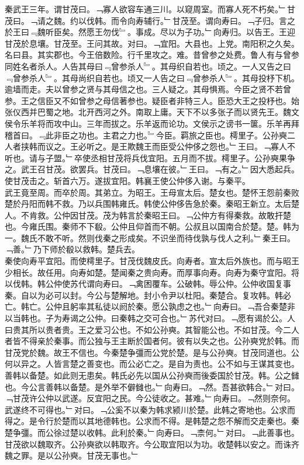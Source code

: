 \documentclass{zhvt-classic}
\begin{document}
\hspace*{2em}秦武王三年。谓甘茂曰。﹁寡人欲容车通三川。以窥周室。而寡人死不朽矣。﹂甘茂曰。﹁请之魏。约以伐韩。而令向寿辅行。﹂甘茂至。谓向寿曰。﹁子归。言之於王曰﹃魏听臣矣。然愿王勿伐﹄。事成。尽以为子功。﹂向寿归。以告王。王迎甘茂於息壤。甘茂至。王问其故。对曰。﹁宜阳。大县也。上党。南阳积之久矣。名曰县。其实郡也。今王倍数险。行千里攻之。难。昔曾参之处费。鲁人有与曾参同姓名者杀人。人告其母曰﹃曾参杀人﹄。其母织自若也。顷之。一人又告之曰﹃曾参杀人﹄。其母尚织自若也。顷又一人告之曰﹃曾参杀人﹄。其母投杼下机。逾墙而走。夫以曾参之贤与其母信之也。三人疑之。其母惧焉。今臣之贤不若曾参。王之信臣又不如曾参之母信著参也。疑臣者非特三人。臣恐大王之投杼也。始张仪西并巴蜀之地。北开西河之外。南取上庸。天下不以多张子而以贤先王。魏文侯令乐羊将而攻中山。三年而拔之。乐羊返而论功。文侯示之谤书一箧。乐羊再拜稽首曰。﹃此非臣之功也。主君之力也。﹄今臣。羁旅之臣也。樗里子。公孙奭二人者挟韩而议之。王必听之。是王欺魏王而臣受公仲侈之怨也。﹂王曰。﹁寡人不听也。请与子盟。﹂卒使丞相甘茂将兵伐宜阳。五月而不拔。樗里子。公孙奭果争之。武王召甘茂。欲罢兵。甘茂曰。﹁息壤在彼。﹂王曰。﹁有之。﹂因大悉起兵。使甘茂击之。斩首六万。遂拔宜阳。韩襄王使公仲侈入谢。与秦平。\\
\hspace*{2em}武王竟至周。而卒於周。其弟立。为昭王。王母宣太后。楚女也。楚怀王怨前秦败楚於丹阳而韩不救。乃以兵围韩雍氏。韩使公仲侈告急於秦。秦昭王新立。太后楚人。不肯救。公仲因甘茂。茂为韩言於秦昭王曰。﹁公仲方有得秦救。故敢扞楚也。今雍氏围。秦师不下殽。公仲且仰首而不朝。公叔且以国南合於楚。楚。韩为一。魏氏不敢不听。然则伐秦之形成矣。不识坐而待伐孰与伐人之利。﹂秦王曰。﹁善。﹂乃下师於殽以救韩。楚兵去。\\
\hspace*{2em}秦使向寿平宜阳。而使樗里子。甘茂伐魏皮氏。向寿者。宣太后外族也。而与昭王少相长。故任用。向寿如楚。楚闻秦之贵向寿。而厚事向寿。向寿为秦守宜阳。将以伐韩。韩公仲使苏代谓向寿曰。﹁禽困覆车。公破韩。辱公仲。公仲收国复事秦。自以为必可以封。今公与楚解地。封小令尹以杜阳。秦楚合。复攻韩。韩必亡。韩亡。公仲且躬率其私徒以阏於秦。愿公孰虑之也。﹂向寿曰。﹁吾合秦楚非以当韩也。子为寿谒之公仲。曰秦韩之交可合也。﹂苏代对曰。﹁愿有谒於公。人曰贵其所以贵者贵。王之爱习公也。不如公孙奭。其智能公也。不如甘茂。今二人者皆不得亲於秦事。而公独与王主断於国者何。彼有以失之也。公孙奭党於韩。而甘茂党於魏。故王不信也。今秦楚争彊而公党於楚。是与公孙奭。甘茂同道也。公何以异之。人皆言楚之善变也。而公必亡之。是自为责也。公不如与王谋其变也。善韩以备楚。如此则无患矣。韩氏必先以国从公孙奭而後委国於甘茂。韩。公之雠也。今公言善韩以备楚。是外举不僻雠也。﹂向寿曰。﹁然。吾甚欲韩合。﹂对曰。﹁甘茂许公仲以武遂。反宜阳之民。今公徒收之。甚难。﹂向寿曰。﹁然则奈何。武遂终不可得也。﹂对曰。﹁公奚不以秦为韩求颍川於楚。此韩之寄地也。公求而得之。是令行於楚而以其地德韩也。公求而不得。是韩楚之怨不解而交走秦也。秦楚争彊。而公徐过楚以收韩。此利於秦。﹂向寿曰。﹁柰何。﹂对曰。﹁此善事也。甘茂欲以魏取齐。公孙奭欲以韩取齐。今公取宜阳以为功。收楚韩以安之。而诛齐魏之罪。是以公孙奭。甘茂无事也。﹂\\
\end{document}
